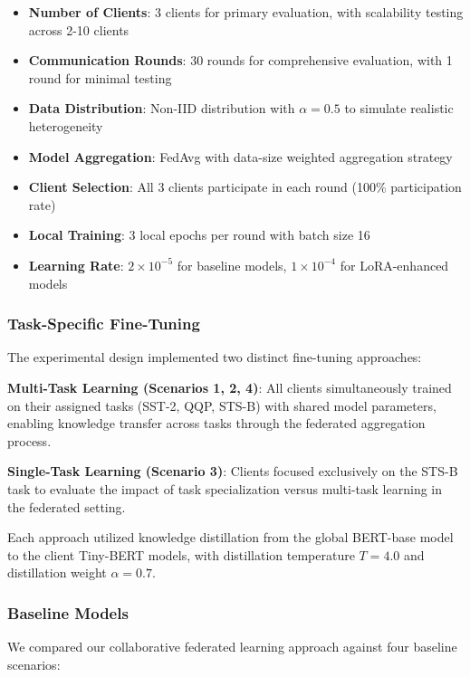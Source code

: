 \begin{itemize}
    \item \textbf{Number of Clients}: 3 clients for primary evaluation, with scalability testing across 2-10 clients
    \item \textbf{Communication Rounds}: 30 rounds for comprehensive evaluation, with 1 round for minimal testing
    \item \textbf{Data Distribution}: Non-IID distribution with $\alpha = 0.5$ to simulate realistic heterogeneity
    \item \textbf{Model Aggregation}: FedAvg with data-size weighted aggregation strategy
    \item \textbf{Client Selection}: All 3 clients participate in each round (100\% participation rate)
    \item \textbf{Local Training}: 3 local epochs per round with batch size 16
    \item \textbf{Learning Rate}: $2 \times 10^{-5}$ for baseline models, $1 \times 10^{-4}$ for LoRA-enhanced models
\end{itemize}

\subsubsection{Task-Specific Fine-Tuning}
The experimental design implemented two distinct fine-tuning approaches:

\textbf{Multi-Task Learning (Scenarios 1, 2, 4)}: All clients simultaneously trained on their assigned tasks (SST-2, QQP, STS-B) with shared model parameters, enabling knowledge transfer across tasks through the federated aggregation process.

\textbf{Single-Task Learning (Scenario 3)}: Clients focused exclusively on the STS-B task to evaluate the impact of task specialization versus multi-task learning in the federated setting.

Each approach utilized knowledge distillation from the global BERT-base model to the client Tiny-BERT models, with distillation temperature $T = 4.0$ and distillation weight $\alpha = 0.7$.

\subsubsection{Baseline Models}
We compared our collaborative federated learning approach against four baseline scenarios:

